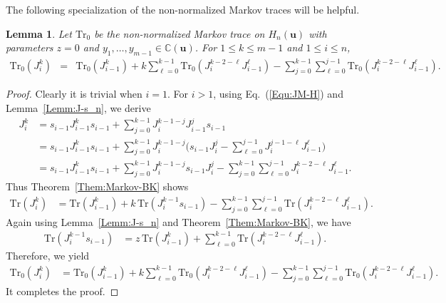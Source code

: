 \documentclass[a4paper, oneside]{amsart}
\numberwithin{equation}{section}
\newtheorem{lemma}[equation]{Lemma}
\theoremstyle{definition}
\theoremstyle{remark}
\begin{document}
The following specialization of the non-normalized Markov traces will be helpful.
\begin{lemma}\label{Lemm:Specialization}Let $\mathrm{Tr}_0$ be the non-normalized Markov trace on $H_n(\boldsymbol{u})$ with parameters $z=0$ and $y_1, \ldots, y_{m-1}\in\mathbb{C}(\boldsymbol{u})$.  For $1\leq k\leq m-1$ and $1\leq i\leq n$,
  \begin{eqnarray*}\mathrm{Tr}_0(J_i^{k})&=&\mathrm{Tr}_0(J_{i-1}^{k})
+k\sum_{\ell=0}^{k-1}\mathrm{Tr}_0(J_{i}^{k-2-\ell}J_{i-1}^{\ell})-
\sum_{j=0}^{k-1}\sum_{\ell=0}^{j-1}\mathrm{Tr}_0(J_{i}^{k-2-\ell}J_{i-1}^{\ell}).
  \end{eqnarray*}
\end{lemma}
\begin{proof}Clearly it is trivial when $i=1$. For $i>1$, using Eq.~(\ref{Equ:JM-H}) and Lemma~\ref{Lemm:J-s_n}, we derive
\begin{align*}
J_{i}^{k}&=s_{i-1}J_{i-1}^{k}s_{i-1}+\sum_{j=0}^{k-1}J_{i}^{k-1-j}J_{i-1}^js_{i-1}\\
&=s_{i-1}J_{i-1}^{k}s_{i-1}+\sum_{j=0}^{k-1}J_{i}^{k-1-j}
\biggl(s_{i-1}J_i^j-\sum_{\ell=0}^{j-1}J_i^{j-1-\ell}J_{i-1}^{\ell}\biggr)\\
&=s_{i-1}J_{i-1}^{k}s_{i-1}+\sum_{j=0}^{k-1}J_{i}^{k-1-j}
s_{i-1}J_i^j-\sum_{j=0}^{k-1}\sum_{\ell=0}^{j-1}J_{i}^{k-2-\ell}J_{i-1}^{\ell}.
\end{align*}
Thus Theorem~\ref{Them:Markov-BK} shows
\begin{align*}
\mathrm{Tr}(J_{i}^{k})&=\mathrm{Tr}(J_{i-1}^{k})+k\,\mathrm{Tr}(J_{i}^{k-1}s_{i-1})-
\sum_{j=0}^{k-1}\sum_{\ell=0}^{j-1}\mathrm{Tr}(J_{i}^{k-2-\ell}J_{i-1}^{\ell}).
\end{align*}
Again using Lemma~\ref{Lemm:J-s_n} and Theorem~\ref{Them:Markov-BK}, we have
\begin{align*}
\mathrm{Tr}(J_{i}^{k-1}s_{i-1})&=z\,\mathrm{Tr}(J_{i-1}^{k})+
\sum_{\ell=0}^{k-1}\mathrm{Tr}(J_{i}^{k-2-\ell}J_{i-1}^{\ell}).
\end{align*}
Therefore, we yield
\begin{align*}
\mathrm{Tr}_0(J_{i}^{k})&=\mathrm{Tr}_0(J_{i-1}^{k})
+k\sum_{\ell=0}^{k-1}\mathrm{Tr}_0(J_{i}^{k-2-\ell}J_{i-1}^{\ell})-
\sum_{j=0}^{k-1}\sum_{\ell=0}^{j-1}\mathrm{Tr}_0(J_{i}^{k-2-\ell}J_{i-1}^{\ell}).
\end{align*}
It completes the proof.
\end{proof}
\end{document}
